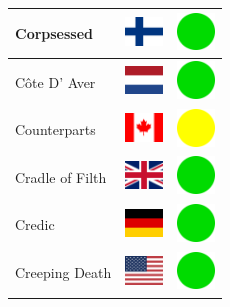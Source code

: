 \documentclass[12pt, a4paper, twoside]{report}
\begin{document}
\begin{center}
\begin{longtable}{|p{5cm}|p{2cm}|p{2cm}|}
Corpsessed & \includegraphics[width=1cm]{4x3/fi} & \includegraphics[width=1cm]{likes/y} \\ \hline
Côte D' Aver & \includegraphics[width=1cm]{4x3/nl} & \includegraphics[width=1cm]{likes/y} \\ \hline
Counterparts & \includegraphics[width=1cm]{4x3/ca} & \includegraphics[width=1cm]{likes/m} \\ \hline
Cradle of Filth & \includegraphics[width=1cm]{4x3/gb} & \includegraphics[width=1cm]{likes/y} \\ \hline
Credic & \includegraphics[width=1cm]{4x3/de} & \includegraphics[width=1cm]{likes/y} \\ \hline
Creeping Death & \includegraphics[width=1cm]{4x3/us} & \includegraphics[width=1cm]{likes/y} \\ \hline

\end{longtable}
\end{center}
\end{document}
